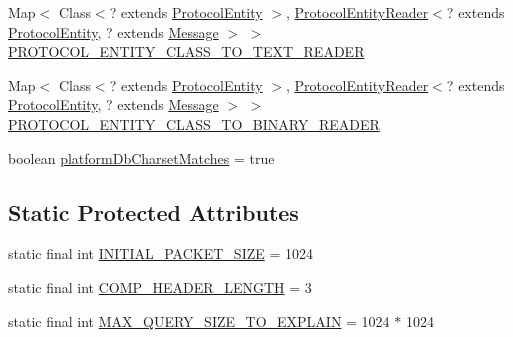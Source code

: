 \begin{DoxyCompactItemize}
\item 
Map$<$ Class$<$? extends \mbox{\hyperlink{interfacecom_1_1mysql_1_1cj_1_1protocol_1_1_protocol_entity}{Protocol\+Entity}} $>$, \mbox{\hyperlink{interfacecom_1_1mysql_1_1cj_1_1protocol_1_1_protocol_entity_reader}{Protocol\+Entity\+Reader}}$<$? extends \mbox{\hyperlink{interfacecom_1_1mysql_1_1cj_1_1protocol_1_1_protocol_entity}{Protocol\+Entity}}, ? extends \mbox{\hyperlink{interfacecom_1_1mysql_1_1cj_1_1protocol_1_1_message}{Message}} $>$ $>$ \mbox{\hyperlink{classcom_1_1mysql_1_1cj_1_1protocol_1_1a_1_1_native_protocol_a622186feee8d445793f13a016b877f5c}{P\+R\+O\+T\+O\+C\+O\+L\+\_\+\+E\+N\+T\+I\+T\+Y\+\_\+\+C\+L\+A\+S\+S\+\_\+\+T\+O\+\_\+\+T\+E\+X\+T\+\_\+\+R\+E\+A\+D\+ER}}
\item 
Map$<$ Class$<$? extends \mbox{\hyperlink{interfacecom_1_1mysql_1_1cj_1_1protocol_1_1_protocol_entity}{Protocol\+Entity}} $>$, \mbox{\hyperlink{interfacecom_1_1mysql_1_1cj_1_1protocol_1_1_protocol_entity_reader}{Protocol\+Entity\+Reader}}$<$? extends \mbox{\hyperlink{interfacecom_1_1mysql_1_1cj_1_1protocol_1_1_protocol_entity}{Protocol\+Entity}}, ? extends \mbox{\hyperlink{interfacecom_1_1mysql_1_1cj_1_1protocol_1_1_message}{Message}} $>$ $>$ \mbox{\hyperlink{classcom_1_1mysql_1_1cj_1_1protocol_1_1a_1_1_native_protocol_a7a0bae11d1173c65e19e4a20904fd60b}{P\+R\+O\+T\+O\+C\+O\+L\+\_\+\+E\+N\+T\+I\+T\+Y\+\_\+\+C\+L\+A\+S\+S\+\_\+\+T\+O\+\_\+\+B\+I\+N\+A\+R\+Y\+\_\+\+R\+E\+A\+D\+ER}}
\item 
boolean \mbox{\hyperlink{classcom_1_1mysql_1_1cj_1_1protocol_1_1a_1_1_native_protocol_af023799e47c29f6821440c5b60fba820}{platform\+Db\+Charset\+Matches}} = true
\end{DoxyCompactItemize}
\subsection*{Static Protected Attributes}
\begin{DoxyCompactItemize}
\item 
static final int \mbox{\hyperlink{classcom_1_1mysql_1_1cj_1_1protocol_1_1a_1_1_native_protocol_a4be60fb21d48090f31c56d45524f4a2d}{I\+N\+I\+T\+I\+A\+L\+\_\+\+P\+A\+C\+K\+E\+T\+\_\+\+S\+I\+ZE}} = 1024
\item 
static final int \mbox{\hyperlink{classcom_1_1mysql_1_1cj_1_1protocol_1_1a_1_1_native_protocol_ae10a626d3cd5fc7b14694f5287f09d6c}{C\+O\+M\+P\+\_\+\+H\+E\+A\+D\+E\+R\+\_\+\+L\+E\+N\+G\+TH}} = 3
\item 
static final int \mbox{\hyperlink{classcom_1_1mysql_1_1cj_1_1protocol_1_1a_1_1_native_protocol_ac81bd41e99ffe0912cfa37024b11b622}{M\+A\+X\+\_\+\+Q\+U\+E\+R\+Y\+\_\+\+S\+I\+Z\+E\+\_\+\+T\+O\+\_\+\+E\+X\+P\+L\+A\+IN}} = 1024 $\ast$ 1024
\end{DoxyCompactItemize}


